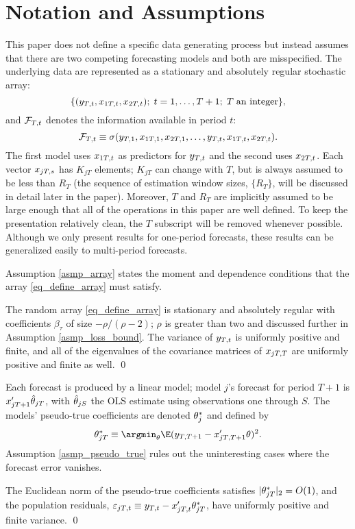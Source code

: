 \documentclass[11pt]{article} \def\baselinestretch{1.08}
\newcommand{\pp}[1]{#1} \newcommand{\intro}[1]{#1}
\begin{document}
\section{Notation and Assumptions} \label{sec_asmp}  
This paper does not define a specific data generating process but
instead assumes that there are two competing forecasting models and both 
are misspecified.
\pp{The underlying data are represented as a stationary and absolutely
  regular stochastic array:
  \begin{equation} \label{eq_define_array}
  \{(y_{T,{t}}, x_{{1}T,{t}}, x_{{2}T,{t}});\;t = 1,\dotsc,T+1;\;T\;\text{an integer}\},
  \end{equation}
and $\mathcal F_{T,{t}}$ denotes the information available in period $t$:
\[
\mathcal F_{T,{t}} \equiv \sigma(y_{T,{1}},x_{{1}T,{1}},x_{{2}T,{1}},\dotsc,
y_{T,{t}},x_{{1}T,{t}},x_{{2}T,{t}}).
\]}
The first model uses $x_{{1}T,{t}}$ as predictors for $y_{T,{t}}$ and the second
uses $x_{{2}T,{t}}$. Each vector $x_{{j}T,{s}}$ has $K_{jT}$ elements;
$K_{jT}$ can change with $T$, but is always assumed to be less than
$R_T$ (the sequence of estimation window sizes, $\{R_T\}$,
will be discussed in detail later in the paper).  Moreover,
$T$ and $R_T$ are implicitly assumed to be large enough that all of
the operations in this paper are well defined.  To keep the
presentation relatively clean, the $T$ subscript will be removed
whenever possible.  Although we only present results for one-period
forecasts, these results can be generalized easily to multi-period
forecasts. 

Assumption \ref{asmp_array} states the moment and dependence conditions
that the array \eqref{eq_define_array} must satisfy.
\begin{asmp} \label{asmp_array}
  The random array \eqref{eq_define_array} 
  is stationary and absolutely regular with coefficients $\beta_\tau$ of
  size $- \rho/(\rho-2)$; $\rho$ is greater than two and discussed further
  in Assumption \ref{asmp_loss_bound}.  The variance of $y_{T,{t}}$ is
  uniformly positive and finite, and all of the eigenvalues of the
  covariance matrices of $x_{{j}T,{T}}$ are uniformly positive and finite
  as well. 
  \qed
\end{asmp}

Each forecast is produced by a linear model; \pp{model $j$'s forecast for 
  period $T+1$ is $x_{{j}{T+1}}'\hat \theta_{{j}{T}}$, with $\hat \theta_{{j}{S}}$ the OLS
  estimate using observations one through $S$.}
The models' pseudo-true coefficients are denoted
$\theta_{j}^*$ and defined by
\[
\BT{j} \equiv \argmin_\theta \E (\yT{T+1} - \xT{j}{T+1}'\theta)^2.
\]
Assumption \ref{asmp_pseudo_true} rules out the uninteresting cases
where the forecast error vanishes.
\begin{asmp} \label{asmp_pseudo_true}
  The Euclidean norm of the pseudo-true coefficients satisfies
  $|\theta^*_{{j}T}|_2 = O(1)$, and the population residuals,
  $\varepsilon_{{j}T,{t}} \equiv y_{T,{t}} - x_{{j}T,{t}}'\theta^*_{{j}T}$, have uniformly positive and finite
  variance.
\qed
\end{asmp}
\end{document}
